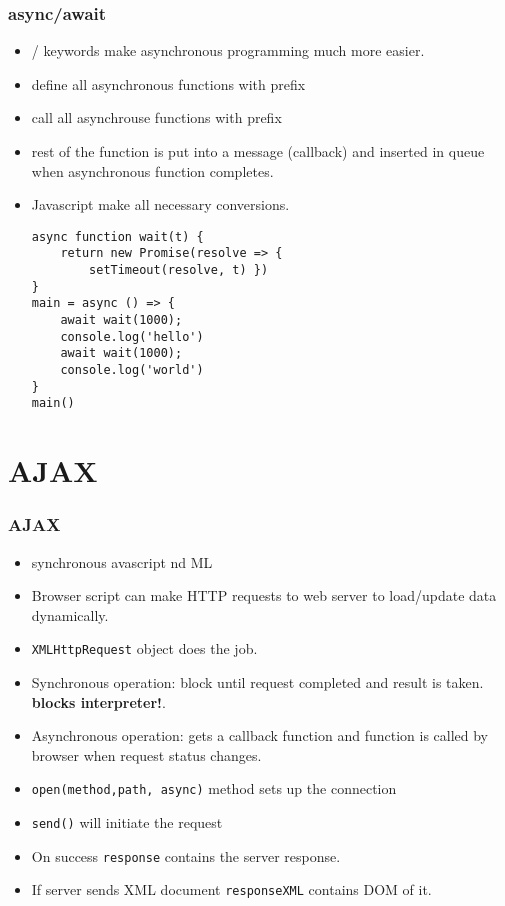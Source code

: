 \documentclass[trans,compress,xcolor=table]{beamer}
\begin{document}
\begin{frame}[fragile]
\frametitle{async/await}
\begin{itemize}
\item {}/ keywords make
asynchronous programming much more easier.
\item define all asynchronous functions with  prefix
\item call all asynchrouse functions with  prefix
\item rest of the function is put into a message (callback) and inserted in queue when asynchronous function completes.
\item Javascript make all necessary conversions.
\begin{lstlisting}
async function wait(t) {
	return new Promise(resolve => {
		setTimeout(resolve, t) })
}
main = async () => {
	await wait(1000);
	console.log('hello')
	await wait(1000);
	console.log('world')
}
main()
\end{lstlisting}
\end{itemize}
\end{frame}

\section{AJAX}
\begin{frame}
\frametitle{AJAX}
\begin{itemize}
\item {}synchronous avascript nd ML 
\item Browser script can make HTTP requests to web server to 
load/update data dynamically.
\item \lstinline!XMLHttpRequest! object does the job.
\item Synchronous operation: block until request completed and result is taken.
	\textbf{blocks interpreter!}. 
\item Asynchronous operation: gets a callback function and function is called
	by browser when request status changes.
\item \lstinline!open(method,path, async)! method sets up the connection
\item \lstinline!send()! will initiate the request
\item On success \lstinline!response! contains the server response.
\item If server sends XML document \lstinline!responseXML! contains DOM of it.
\end{itemize}
\end{frame}
\end{document}
